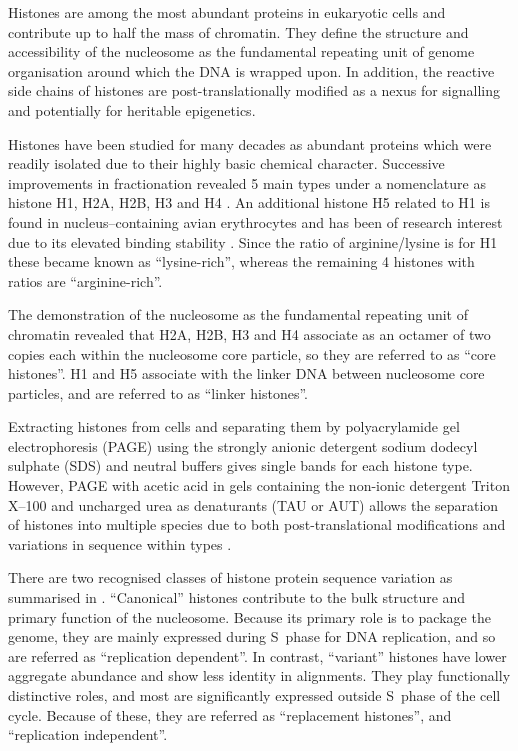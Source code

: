 \documentclass[10pt,a4paper,twocolumn,article]{memoir}
\begin{document}
    Histones are among the most abundant proteins in eukaryotic cells and contribute up
    to half the mass of chromatin. They define the structure and accessibility of the
    nucleosome as the fundamental repeating unit of genome organisation around which
    the DNA is wrapped upon. In addition, the reactive
    side chains of histones are post-translationally modified as a nexus for signalling
    and potentially for heritable epigenetics.

    Histones have been studied for many decades as abundant proteins which were readily
    isolated due to their highly basic chemical character. Successive improvements in
    fractionation revealed 5 main types under a nomenclature as histone H1, H2A, H2B, H3
    and H4 \citep{nomenclature}. An additional histone H5 related to H1 is found in
    nucleus--containing avian erythrocytes and has been of research interest due to its
    elevated binding stability \citep{HFive-review}.
    Since the ratio of arginine/lysine is \LinkerArgLysRatio{}
    for H1 these became known as ``lysine-rich'', whereas the remaining 4 histones with
    ratios \CoreArgLysRatio{} are ``arginine-rich''.

    The demonstration of the nucleosome as the fundamental repeating unit of chromatin revealed
    that H2A, H2B, H3 and H4 associate as an octamer of two copies each within the
    nucleosome core particle, so they are referred to as ``core histones''. H1 and H5
    associate with the linker DNA between nucleosome core particles, and are referred to
    as ``linker histones''.

    Extracting histones from cells and separating them by polyacrylamide gel electrophoresis
    (PAGE) using the strongly anionic detergent sodium dodecyl sulphate (SDS) and neutral
    buffers gives single bands for each histone type. However, PAGE with acetic acid in gels
    containing the non-ionic detergent Triton X--100 and uncharged urea as denaturants
    (TAU or AUT) allows the separation of histones into multiple species due to both
    post-translational modifications and variations in sequence within types \citep{PAGEND}.

    There are two recognised classes of histone protein sequence variation as summarised
    in . ``Canonical'' histones contribute to the
    bulk structure and primary function of the nucleosome. Because its primary role is to
    package the genome, they are mainly expressed during S~phase for DNA replication,
    and so are referred as ``replication dependent''. In contrast, ``variant'' histones
    have lower aggregate abundance and show less identity in alignments. They play
    functionally distinctive roles, and most are significantly expressed outside S~phase
    of the cell cycle. Because of these, they are referred as ``replacement histones'',
    and ``replication independent''.
\end{document}
